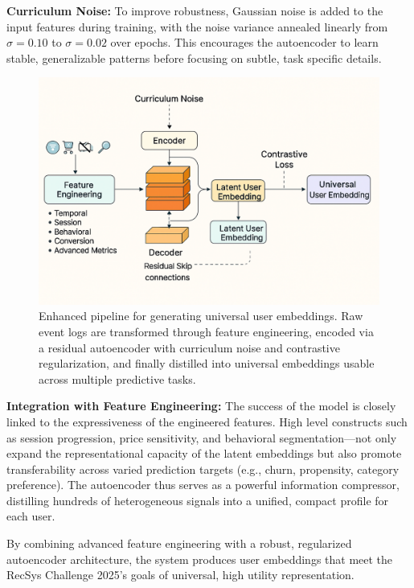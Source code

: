 \documentclass[sigconf]{acmart}
\begin{document}
\textbf{Curriculum Noise:}  
To improve robustness, Gaussian noise is added to the input features during training, with the noise variance annealed linearly from $\sigma=0.10$ to $\sigma=0.02$ over epochs. This encourages the autoencoder to learn stable, generalizable patterns before focusing on subtle, task specific details.

\begin{figure}[htb!]
  \centering
  \includegraphics[width=0.9\linewidth]{detail.png}
  \caption{Enhanced pipeline for generating universal user embeddings. Raw event logs are transformed through feature engineering, encoded via a residual autoencoder with curriculum noise and contrastive regularization, and finally distilled into universal embeddings usable across multiple predictive tasks.}
  \label{fig:architecture}
\end{figure}

\textbf{Integration with Feature Engineering:}  
The success of the model is closely linked to the expressiveness of the engineered features. High level constructs such as session progression, price sensitivity, and behavioral segmentation—not only expand the representational capacity of the latent embeddings but also promote transferability across varied prediction targets (e.g., churn, propensity, category preference). The autoencoder thus serves as a powerful information compressor, distilling hundreds of heterogeneous signals into a unified, compact profile for each user.

By combining advanced feature engineering with a robust, regularized autoencoder architecture, the system produces user embeddings that meet the RecSys Challenge 2025’s goals of universal, high utility representation.
\end{document}
